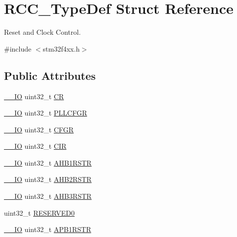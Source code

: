 \hypertarget{struct_r_c_c___type_def}{}\section{R\+C\+C\+\_\+\+Type\+Def Struct Reference}
\label{struct_r_c_c___type_def}


Reset and Clock Control.  




{\ttfamily \#include $<$stm32f4xx.\+h$>$}

\subsection*{Public Attributes}
\begin{DoxyCompactItemize}
\item 
\hyperlink{core__cm4_8h_aec43007d9998a0a0e01faede4133d6be}{\+\_\+\+\_\+\+IO} uint32\+\_\+t \hyperlink{struct_r_c_c___type_def_abcb9ff48b9afb990283fefad0554b5b3}{CR}
\item 
\hyperlink{core__cm4_8h_aec43007d9998a0a0e01faede4133d6be}{\+\_\+\+\_\+\+IO} uint32\+\_\+t \hyperlink{struct_r_c_c___type_def_a2a7ccb4e23cb05a574f243f6278b7b26}{P\+L\+L\+C\+F\+GR}
\item 
\hyperlink{core__cm4_8h_aec43007d9998a0a0e01faede4133d6be}{\+\_\+\+\_\+\+IO} uint32\+\_\+t \hyperlink{struct_r_c_c___type_def_a0721b1b729c313211126709559fad371}{C\+F\+GR}
\item 
\hyperlink{core__cm4_8h_aec43007d9998a0a0e01faede4133d6be}{\+\_\+\+\_\+\+IO} uint32\+\_\+t \hyperlink{struct_r_c_c___type_def_aeadf3a69dd5795db4638f71938704ff0}{C\+IR}
\item 
\hyperlink{core__cm4_8h_aec43007d9998a0a0e01faede4133d6be}{\+\_\+\+\_\+\+IO} uint32\+\_\+t \hyperlink{struct_r_c_c___type_def_ad6abf71a348744aa3f2b7e8b214c1ca4}{A\+H\+B1\+R\+S\+TR}
\item 
\hyperlink{core__cm4_8h_aec43007d9998a0a0e01faede4133d6be}{\+\_\+\+\_\+\+IO} uint32\+\_\+t \hyperlink{struct_r_c_c___type_def_a343e0230ded55920ff2a04fbde0e5bcd}{A\+H\+B2\+R\+S\+TR}
\item 
\hyperlink{core__cm4_8h_aec43007d9998a0a0e01faede4133d6be}{\+\_\+\+\_\+\+IO} uint32\+\_\+t \hyperlink{struct_r_c_c___type_def_a39a90d838fbd0b8515f03e4a1be6374f}{A\+H\+B3\+R\+S\+TR}
\item 
uint32\+\_\+t \hyperlink{struct_r_c_c___type_def_a646631532167f3386763a2d10a881a04}{R\+E\+S\+E\+R\+V\+E\+D0}
\item 
\hyperlink{core__cm4_8h_aec43007d9998a0a0e01faede4133d6be}{\+\_\+\+\_\+\+IO} uint32\+\_\+t \hyperlink{struct_r_c_c___type_def_a600f4d6d592f43edb2fc653c5cba023a}{A\+P\+B1\+R\+S\+TR}

\end{DoxyCompactItemize}
